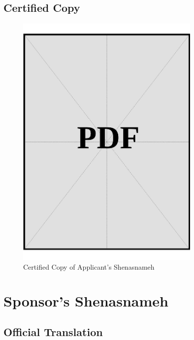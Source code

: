 \clearpage
\subsection*{Certified Copy}
\vspace*{\fill}
\begin{figure}[h]
    \centering
    \includegraphics[page=1, width=0.8\textwidth]{../application-docs/applicant/identification/shenasnameh/certified-copies.pdf}
    \caption{Certified Copy of Applicant's Shenasnameh}
    \label{fig:applicant-shenasnameh-certified-copy}
\end{figure}
\vspace*{\fill}

\clearpage


\section{Sponsor's Shenasnameh}\label{sec:sponsor-shenasnameh}

\subsection*{Official Translation}
\vspace*{\fill}

